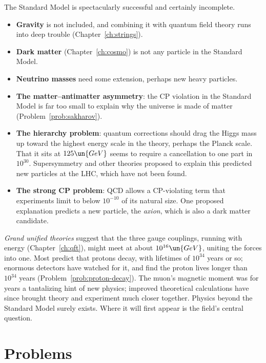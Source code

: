The Standard Model is spectacularly successful and certainly incomplete.
\begin{itemize}[itemsep=4pt]
  \item \textbf{Gravity} is not included, and combining it with quantum field theory runs into deep trouble (Chapter~\ref{ch:strings}).
  \item \textbf{Dark matter} (Chapter~\ref{ch:cosmo}) is not any particle in the Standard Model.
  \item \textbf{Neutrino masses} need some extension, perhaps new heavy particles.
  \item \textbf{The matter--antimatter asymmetry}: the CP violation in the Standard Model is far too small to explain why the universe is made of matter (Problem~\ref{prob:sakharov}).
  \item \textbf{The hierarchy problem}: quantum corrections should drag the Higgs mass up toward the highest energy scale in the theory, perhaps the Planck scale. That it sits at $125\un{GeV}$ seems to require a cancellation to one part in $10^{30}$. Supersymmetry and other theories proposed to explain this predicted new particles at the LHC, which have not been found.
  \item \textbf{The strong CP problem}: QCD allows a CP-violating term that experiments limit to below $10^{-10}$ of its natural size. One proposed explanation predicts a new particle, the \emph{axion}, which is also a dark matter candidate.
\end{itemize}
\emph{Grand unified theories} suggest that the three gauge couplings, running with energy (Chapter~\ref{ch:qft}), might meet at about $10^{16}\un{GeV}$, uniting the forces into one. Most predict that protons decay, with lifetimes of $10^{34}$ years or so; enormous detectors have watched for it, and find the proton lives longer than $10^{34}$ years (Problem~\ref{prob:proton-decay}). The muon's magnetic moment was for years a tantalizing hint of new physics; improved theoretical calculations have since brought theory and experiment much closer together. Physics beyond the Standard Model surely exists. Where it will first appear is the field's central question.

\section{Problems}

